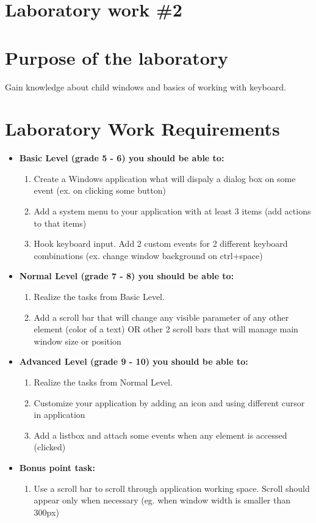 \section*{Laboratory work \#2}

\section{Purpose of the laboratory}
Gain knowledge about child windows and basics of working with keyboard.
\section{Laboratory Work Requirements}
\begin{itemize}
\item \textbf{Basic Level (grade 5 - 6) you should be able to:}
	\begin{enumerate}
	\item Create a Windows application what will dispaly a dialog box on some event (ex. on clicking some button)
      \item Add a system menu to your application with at least 3 items (add actions to that items)
      \item Hook keyboard input. Add 2 custom events for 2 different keyboard combinations (ex. change window background on ctrl+space) 
      \end{enumerate}
\item \textbf{Normal Level (grade 7 - 8) you should be able to:}
      \begin{enumerate}
     \item Realize the tasks from Basic Level.
    \item Add a scroll bar that will change any visible parameter of any other element (color of a text) OR other 2 scroll bars that will manage main window size or position
          \end{enumerate}
\item \textbf{Advanced Level (grade 9 - 10) you should be able to:}
      \begin{enumerate}
    \item Realize the tasks from Normal Level.
    \item Customize your application by adding an icon and using different cursor in application
    \item Add a listbox and attach some events when any element is accessed (clicked) 
          \end{enumerate}
\item \textbf{Bonus point task:}
      \begin{enumerate}
    \item Use a scroll bar to scroll through application working space. Scroll should appear only when necessary (eg. when window width is smaller than 300px)
    	\end{enumerate}
  \end{itemize}  

\clearpage
